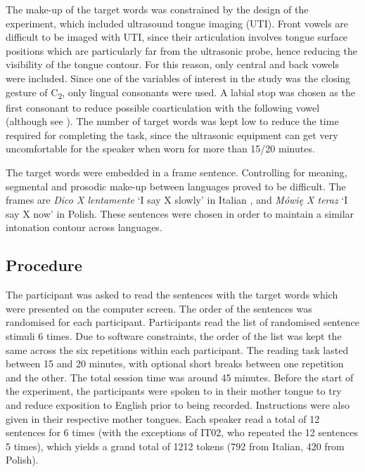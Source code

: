 \documentclass[charis]{glossa}
\begin{document}
The make-up of the target words was constrained by the design of the
experiment, which included ultrasound tongue imaging (UTI). Front vowels
are difficult to be imaged with UTI, since their articulation involves
tongue surface positions which are particularly far from the ultrasonic
probe, hence reducing the visibility of the tongue contour. For this
reason, only central and back vowels were included. Since one of the
variables of interest in the study was the closing gesture of
C\textsubscript{2}, only lingual consonants were used. A labial stop was
chosen as the first consonant to reduce possible coarticulation with the
following vowel (although see \citealt{vazquez-alvarez2007}). The number
of target words was kept low to reduce the time required for completing
the task, since the ultrasonic equipment can get very uncomfortable for
the speaker when worn for more than 15/20 minutes.

The target words were embedded in a frame sentence. Controlling for
meaning, segmental and prosodic make-up between languages proved to be
difficult. The frames are \emph{Dico X lentamente} `I say X slowly' in
Italian \citep[following][]{hajek2008}, and \emph{Mówię X teraz} `I say
X now' in Polish. These sentences were chosen in order to maintain a
similar intonation contour across languages.

\hypertarget{procedure}{%
\subsection{Procedure}\label{procedure}}

\label{s:procedure}

The participant was asked to read the sentences with the target words
which were presented on the computer screen. The order of the sentences
was randomised for each participant. Participants read the list of
randomised sentence stimuli 6 times. Due to software constraints, the
order of the list was kept the same across the six repetitions within
each participant. The reading task lasted between 15 and 20 minutes,
with optional short breaks between one repetition and the other. The
total session time was around 45 minutes. Before the start of the
experiment, the participants were spoken to in their mother tongue to
try and reduce exposition to English prior to being recorded.
Instructions were also given in their respective mother tongues. Each
speaker read a total of 12 sentences for 6 times (with the exceptions of
IT02, who repeated the 12 sentences 5 times), which yields a grand total
of 1212 tokens (792 from Italian, 420 from Polish).
\end{document}

